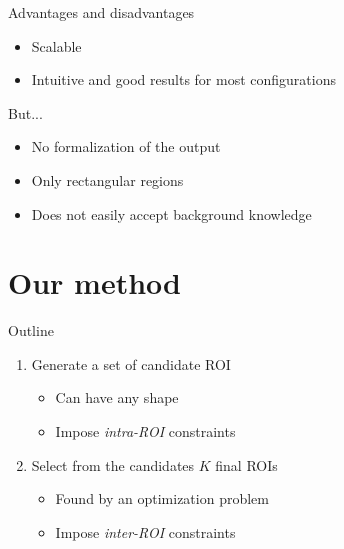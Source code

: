 \documentclass[10pt]{beamer}
\begin{document}
\begin{frame}{Advantages and disadvantages}
    \begin{itemize}
        \item Scalable
        \item Intuitive and good results for most configurations
    \end{itemize}
    But...
    \begin{itemize}
        \item No formalization of the output
        \item Only rectangular regions
        \item Does not easily accept background knowledge
    \end{itemize}
\end{frame}

\section{Our method}

\begin{frame}{Outline}
    \begin{enumerate}
        \item Generate a set of candidate ROI
        \begin{itemize}
            \item Can have any shape
            \item Impose \emph{intra-ROI} constraints
        \end{itemize}
        \item Select from the candidates $K$ final ROIs
        \begin{itemize}
            \item Found by an optimization problem
            \item Impose \emph{inter-ROI} constraints
        \end{itemize}
    \end{enumerate}
\end{frame}
\end{document}
